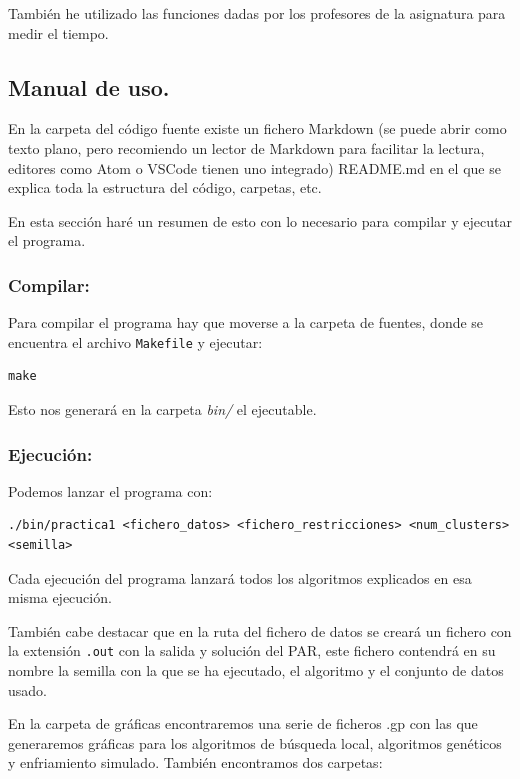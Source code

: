 \documentclass[12pt, spanish]{article}
\begin{document}
También he utilizado las funciones dadas por los profesores de la asignatura para medir el tiempo.


\subsection{Manual de uso.}

En la carpeta del código fuente existe un fichero Markdown (se puede abrir como texto plano, pero recomiendo un lector de Markdown para facilitar la lectura, editores como Atom o VSCode tienen uno integrado) README.md en el que se explica toda la estructura del código, carpetas, etc.

En esta sección haré un resumen de esto con lo necesario para compilar y ejecutar el programa.

\subsubsection{Compilar:}

Para compilar el programa hay que moverse a la carpeta de fuentes, donde se encuentra el archivo \texttt{Makefile} y ejecutar:

\begin{lstlisting}
make
\end{lstlisting}

Esto nos generará en la carpeta \textit{bin/} el ejecutable.




\subsubsection{Ejecución:}

Podemos lanzar el programa con:

\begin{lstlisting}
./bin/practica1 <fichero_datos> <fichero_restricciones> <num_clusters> <semilla>
\end{lstlisting}

Cada ejecución del programa lanzará todos los algoritmos explicados en esa misma ejecución.

También cabe destacar que en la ruta del fichero de datos se creará un fichero con la extensión \texttt{.out} con la salida y solución del PAR, este fichero contendrá en su nombre la semilla con la que se ha ejecutado, el algoritmo y el conjunto de datos usado.

En la carpeta de gráficas encontraremos una serie de ficheros .gp con las que generaremos gráficas para los algoritmos de búsqueda local, algoritmos genéticos y enfriamiento simulado. También encontramos dos carpetas:
\end{document}
